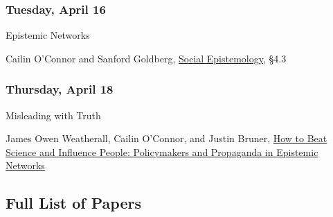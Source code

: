 \documentclass[
  12pt,
  letterpaper,
  DIV=11,
  numbers=noendperiod]{scrartcl}
\providecommand{\tightlist}{%
  \setlength{\itemsep}{0pt}\setlength{\parskip}{0pt}}\usepackage{longtable,booktabs,array}
\begin{document}
\subsubsection{Tuesday, April 16}\label{tuesday-april-16}

\begin{description}
\tightlist
\item[Topic]
Epistemic Networks
\item[Reading]
Cailin O'Connor and Sanford Goldberg,
\href{https://plato.stanford.edu/entries/epistemology-social/\#NetwEpisMode}{Social
Epistemology}, §4.3
\end{description}

\subsubsection{Thursday, April 18}\label{thursday-april-18}

\begin{description}
\tightlist
\item[Topic]
Misleading with Truth
\item[Reading]
James Owen Weatherall, Cailin O'Connor, and Justin Bruner,
\href{https://www.journals.uchicago.edu/doi/abs/10.1093/bjps/axy062}{How
to Beat Science and Influence People: Policymakers and Propaganda in
Epistemic Networks}
\end{description}

\newpage

\subsection{Full List of Papers}\label{full-list-of-papers}
\end{document}
